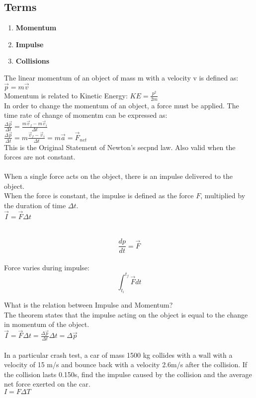 \documentclass[]{article}
\begin{document}
\subsection*{Terms}
\begin{enumerate}
    \item[] \textbf{Momentum}
    \item[] \textbf{Impulse}
    \item[] \textbf{Collisions}
\end{enumerate}
The linear momentum of an object of mass m with a velocity v is defined as:\\
$\vec{p} = m\vec{v}$\\
Momentum is related to Kinetic Energy: $KE = \frac{p^2}{2m}$\\
In order to change the momentum of an object, a force must be applied. The time rate of change of momentm can be expressed as:\\
$\frac{\Delta\vec{p}}{\Delta t} = \frac{m\vec{v}_f - m\vec{v}_i}{\Delta t}$\\
$\frac{\Delta\vec{p}}{\Delta t} = m\frac{\vec{v}_f - \vec{v}_i}{\Delta t} = m\vec{a} = \vec{F}_{net}$\\
This is the Original Statement of Newton's secpnd law.
Also valid when the forces are not constant.\\
\\
When a single force acts on the object, there is an impulse delivered to the object.\\
When the force is constant, the impulse is defined as the force $F$, multiplied by the duration of time $\Delta t$.\\
$\vec{I} = \vec{F}\Delta{t}$\\
\\
\\
\begin{equation*}
    \frac{dp}{dt} = \vec{F}
\end{equation*}\\
\newpage
Force varies during impulse:\\
\begin{equation*}
    \int_{t_i}^{t_f}\vec{F}dt
\end{equation*}

What is the relation between Impulse and Momentum?\\
The theorem states that the impulse acting on the object is equal to the change in momentum of the object.\\
$\vec{I} = \vec{F}\Delta t = \frac{\Delta \vec{p}}{\Delta t}\Delta t = \Delta \vec{p}$\\
\vspace{2in}\\
In a particular crash test, a car of mass 1500 kg collides with a wall with a velocity of 15 m/s and bounce back with a velocity 2.6m/s after the collision. If the collision lasts 0.150s, find the impulse caused by the collision and the average net force exerted on the car.\\
$I = F \Delta T$
\newpage
\end{document}
